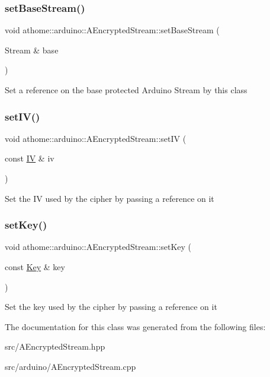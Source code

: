 \subsubsection{\texorpdfstring{set\+Base\+Stream()}{setBaseStream()}}
{\footnotesize\ttfamily void athome\+::arduino\+::\+A\+Encrypted\+Stream\+::set\+Base\+Stream (\begin{DoxyParamCaption}\item[{Stream \&}]{base }\end{DoxyParamCaption})}

Set a reference on the base protected Arduino Stream by this class \mbox{\label{classathome_1_1arduino_1_1_a_encrypted_stream_a410aec7c93eaa6fd440e8c8bd47606f7}} 
\subsubsection{\texorpdfstring{set\+I\+V()}{setIV()}}
{\footnotesize\ttfamily void athome\+::arduino\+::\+A\+Encrypted\+Stream\+::set\+IV (\begin{DoxyParamCaption}\item[{const \mbox{\hyperlink{classathome_1_1arduino_1_1_a_encrypted_stream_a4a0c027bc7503bb0da538d6a2f0657e6}{IV}} \&}]{iv }\end{DoxyParamCaption})}

Set the IV used by the cipher by passing a reference on it \mbox{\label{classathome_1_1arduino_1_1_a_encrypted_stream_a83d9b4d1374a46d5793709f774c1e03a}} 
\subsubsection{\texorpdfstring{set\+Key()}{setKey()}}
{\footnotesize\ttfamily void athome\+::arduino\+::\+A\+Encrypted\+Stream\+::set\+Key (\begin{DoxyParamCaption}\item[{const \mbox{\hyperlink{classathome_1_1arduino_1_1_a_encrypted_stream_a2f0fd4a9c2a74a4ae857a4447aa3956f}{Key}} \&}]{key }\end{DoxyParamCaption})}

Set the key used by the cipher by passing a reference on it 

The documentation for this class was generated from the following files\+:\begin{DoxyCompactItemize}
\item 
src/A\+Encrypted\+Stream.\+hpp\item 
src/arduino/A\+Encrypted\+Stream.\+cpp\end{DoxyCompactItemize}
